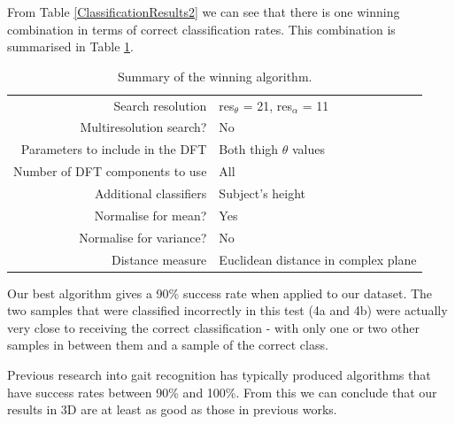 \documentclass[a4paper,12pt]{article}
\begin{document}
\bigskip
From Table \ref{ClassificationResults2} we can see that there is one winning combination in terms of correct classification rates.
This combination is summarised in Table \ref{ConclusionTable}.

\begin{table}[hb]
	\centering
	\begin{tabular}{r|l}
		Search resolution & res$_\theta$ = 21, res$_\alpha$ = 11 \\
		Multiresolution search? & No \\
		Parameters to include in the DFT & Both thigh $\theta$ values\\
		Number of DFT components to use & All \\
		Additional classifiers & Subject's height \\
		Normalise for mean? & Yes \\
		Normalise for variance? & No \\
		Distance measure & Euclidean distance in complex plane
	\end{tabular}
	\caption{Summary of the winning algorithm.}
	\label{ConclusionTable}
\end{table}

Our best algorithm gives a 90\% success rate when applied to our dataset.
The two samples that were classified incorrectly in this test (4a and 4b) were actually very close to receiving the correct classification - with only one or two other samples in between them and a sample of the correct class.

Previous research into gait recognition has typically produced algorithms that have success rates between 90\% and 100\%.
From this we can conclude that our results in 3D are at least as good as those in previous works.
\end{document}
